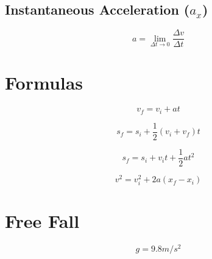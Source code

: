 \documentclass[12pt]{article}
\begin{document}
\begin{spacing}{1.5}
\subsection{Instantaneous Acceleration ($a_x$)}

$$a = \lim_{\Delta t \rightarrow 0} \frac{\Delta v}{\Delta t}$$

\section{Formulas}

$$v_f = v_i + at$$

$$s_f = s_i + \frac{1}{2} (v_i + v_f) t$$

$$s_f = s_i + v_i t + \frac{1}{2} at^2$$

$$v^2 = v_i^2 + 2a(x_f - x_i)$$

\section{Free Fall}

$$g = 9.8 m/s^2$$



\end{spacing}
\end{document}
